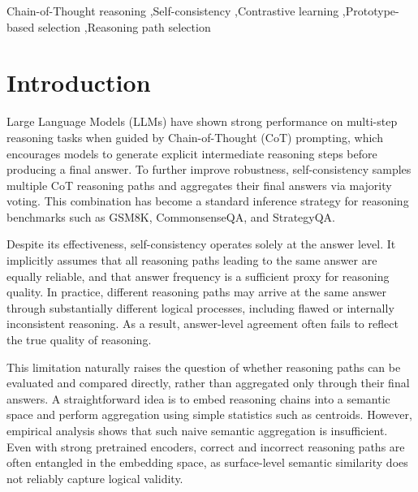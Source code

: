 \documentclass[a4paper,fleqn]{cas-dc}
\begin{document}
\begin{keywords}
Chain-of-Thought reasoning \sep Self-consistency \sep Contrastive learning \sep Prototype-based selection \sep Reasoning path selection
\end{keywords}

\maketitle

\section{Introduction}

Large Language Models (LLMs) have shown strong performance on multi-step reasoning tasks when guided by Chain-of-Thought (CoT) \citep{wei2023chainofthoughtpromptingelicitsreasoning} prompting, which encourages models to generate explicit intermediate reasoning steps before producing a final answer.
To further improve robustness, self-consistency \citep{wang2023selfconsistencyimproveschainofthoughtreasoning} samples multiple CoT reasoning paths and aggregates their final answers via majority voting.
This combination has become a standard inference strategy for reasoning benchmarks such as GSM8K, CommonsenseQA, and StrategyQA.

Despite its effectiveness, self-consistency operates solely at the answer level.
It implicitly assumes that all reasoning paths leading to the same answer are equally reliable, and that answer frequency is a sufficient proxy for reasoning quality.
In practice, different reasoning paths may arrive at the same answer through substantially different logical processes, including flawed or internally inconsistent reasoning.
As a result, answer-level agreement often fails to reflect the true quality of reasoning.

This limitation naturally raises the question of whether reasoning paths can be evaluated and compared directly, rather than aggregated only through their final answers.
A straightforward idea is to embed reasoning chains into a semantic space and perform aggregation using simple statistics such as centroids.
However, empirical analysis shows that such naive semantic aggregation is insufficient.
Even with strong pretrained encoders, correct and incorrect reasoning paths are often entangled in the embedding space, as surface-level semantic similarity does not reliably capture logical validity.
\end{document}
